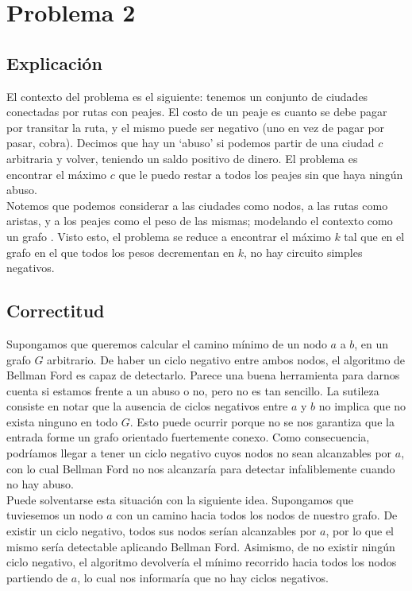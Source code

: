 
\section{Problema 2}

\subsection{Explicación}

El contexto del problema es el siguiente: tenemos un conjunto de ciudades conectadas por rutas con peajes. El costo de un peaje es cuanto se debe pagar por transitar la ruta, y el mismo puede ser negativo (uno en vez de pagar por pasar, cobra). Decimos que hay un `abuso' si podemos partir de una ciudad $c$ arbitraria y volver, teniendo un saldo positivo de dinero. El problema es encontrar el máximo $c$ que le puedo restar a todos los peajes sin que haya ningún abuso. \\

Notemos que podemos considerar a las ciudades como nodos, a las rutas como aristas, y a los peajes como el peso de las mismas; modelando el contexto como un grafo . Visto esto, el problema se reduce a encontrar el máximo $k$ tal que en el grafo en el que todos los pesos decrementan en $k$, no hay circuito simples negativos. \\

\subsection{Correctitud}

Supongamos que queremos calcular el camino mínimo de un nodo $a$ a $b$, en un grafo $G$ arbitrario. De haber un ciclo negativo entre ambos nodos, el algoritmo de Bellman Ford es capaz de detectarlo. Parece una buena herramienta para darnos cuenta si estamos frente a un abuso o no, pero no es tan sencillo. La sutileza consiste en notar que la ausencia de ciclos negativos entre $a$ y $b$ no implica que no exista ninguno en todo $G$. Esto puede ocurrir porque no se nos garantiza que la entrada forme un grafo orientado fuertemente conexo. Como consecuencia, podríamos llegar a tener un ciclo negativo cuyos nodos no sean alcanzables por $a$, con lo cual Bellman Ford no nos alcanzaría para detectar infaliblemente cuando no hay abuso.\\

Puede solventarse esta situación con la siguiente idea. Supongamos que tuviesemos un nodo $a$ con un camino hacia todos los nodos de nuestro grafo. De existir un ciclo negativo, todos sus nodos serían alcanzables por $a$, por lo que el mismo sería detectable aplicando Bellman Ford. Asimismo, de no existir ningún ciclo negativo, el algoritmo devolvería el mínimo recorrido hacia todos los nodos partiendo de $a$, lo cual nos informaría que no hay ciclos negativos. \\

